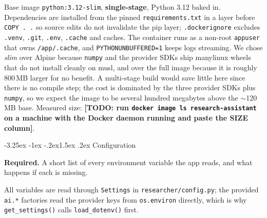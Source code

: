 \documentclass[11pt,a4paper]{article}
\makeatletter
\newcommand{\TODO}[1]{\textcolor{accent2}{\textbf{[TODO: #1]}}}
\renewcommand\subsection{\@startsection{subsection}{2}{\z@}%
    {-3.25ex \@plus -1ex \@minus -.2ex}{1.5ex \@plus .2ex}%
    {\normalfont\large\bfseries\color{accent}}}%
\makeatother
\begin{document}
Base image \texttt{python:3.12-slim}, \textbf{single-stage}, Python 3.12 baked in. Dependencies are installed from the pinned \texttt{requirements.txt} in a layer before \texttt{COPY . .} so source edits do not invalidate the pip layer; \texttt{.dockerignore} excludes \texttt{.venv}, \texttt{.git}, \texttt{.env}, \texttt{.cache} and caches. The container runs as a non-root \texttt{appuser} that owns \texttt{/app/.cache}, and \texttt{PYTHONUNBUFFERED=1} keeps logs streaming. We chose \emph{slim} over Alpine because \texttt{numpy} and the provider SDKs ship manylinux wheels that do not install cleanly on musl, and over the full image because it is roughly 800\,MB larger for no benefit. A multi-stage build would save little here since there is no compile step; the cost is dominated by the three provider SDKs plus \texttt{numpy}, so we expect the image to be several hundred megabytes above the $\sim$120\,MB base. Measured size: \TODO{run \texttt{docker image ls research-assistant} on a machine with the Docker daemon running and paste the SIZE column}.

\subsection{Configuration}

\begin{deliverbox}
\textbf{Required.} A short list of every environment variable the app reads, and what happens if each is missing.
\end{deliverbox}

All variables are read through \texttt{Settings} in \texttt{researcher/config.py}; the provided \texttt{ai.*} factories read the provider keys from \texttt{os.environ} directly, which is why \texttt{get\_settings()} calls \texttt{load\_dotenv()} first.
\end{document}
